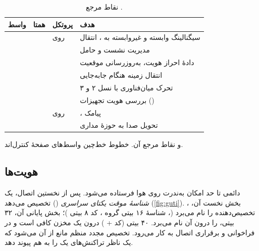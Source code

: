 \documentclass[11pt,a4paper]{article}
\begin{document}
\begin{table}[htbp]
\centering\small
\caption{نقاط مرجع .}\label{tab:ifaces}
\begin{tabularx}{\linewidth}{@{}l l l Y@{}}
\toprule
{}واسط & همتا & پروتکل & هدف \\
\midrule
{} &          &  روی   & سیگنالینگ وابسته و غیروابسته به ، انتقال  \cite{ts36413} \\
    &           &                & مدیریت نشست و حامل \cite{ts29274} \\
    &          &               & دادهٔ احراز هویت، به‌روزرسانی موقعیت \cite{ts29272} \\
    &          &                & انتقال زمینه هنگام جابه‌جایی  \\
     &         &                & تحرک میان‌فناوری با نسل ۲ و ۳ \\
    &          &               & بررسی هویت تجهیزات () \\
    &        &  روی  & ، پیامک \cite{ts23272} \\
     &          &                & تحویل  صدا به حوزهٔ مداری \cite{ts23216} \\
\bottomrule
\end{tabularx}
\end{table}

\begin{acnfigure}
  \caption{ و نقاط مرجع آن. خطوط خط‌چین واسط‌های صفحهٔ کنترل‌اند.}
  \label{fig:ifaces}
\end{acnfigure}

\subsection{هویت‌ها}
 دائمی تا حد امکان به‌ندرت روی هوا فرستاده می‌شود. پس از نخستین اتصال،  یک \emph{شناسهٔ موقت یکتای
سراسری} () تخصیص می‌دهد \cite{ts23003} (\cref{fig:guti}). بخش نخست آن، ،  تخصیص‌دهنده
را نام می‌برد (، شناسهٔ ۱۶ بیتی گروه ، کد ۸ بیتی )؛ بخش پایانی آن،  ۳۲ بیتی،
 را درون آن  نام می‌برد.  ۴۰ بیتی (کد  + ) درون یک مخزن کافی است و در
فراخوانی و برقراری اتصال  به کار می‌رود. تخصیص مجدد منظم  مانع از آن می‌شود که یک ناظر
تراکنش‌های یک  را به هم پیوند دهد.
\end{document}
